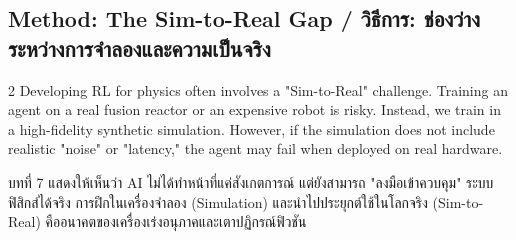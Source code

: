 \subsection{Method: The Sim-to-Real Gap \quad / \quad \textthai{วิธีการ: ช่องว่างระหว่างการจำลองและความเป็นจริง}}
\begin{paracol}{2}
Developing RL for physics often involves a "Sim-to-Real" challenge. Training an agent on a real fusion reactor or an expensive robot is risky. Instead, we train in a high-fidelity synthetic simulation. However, if the simulation does not include realistic "noise" or "latency," the agent may fail when deployed on real hardware.

\switchcolumn

\begin{thai}
บทที่ 7 แสดงให้เห็นว่า AI ไม่ได้ทำหน้าที่แค่สังเกตการณ์ แต่ยังสามารถ "ลงมือเข้าควบคุม" ระบบฟิสิกส์ได้จริง การฝึกในเครื่องจำลอง (Simulation) และนำไปประยุกต์ใช้ในโลกจริง (Sim-to-Real) คืออนาคตของเครื่องเร่งอนุภาคและเตาปฏิกรณ์ฟิวชัน
\end{thai}
\end{paracol}
